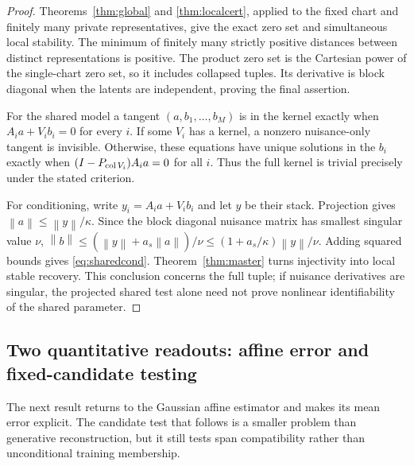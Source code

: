\documentclass[11pt,a4paper]{article}
\theoremstyle{definition}
\theoremstyle{definition}
\theoremstyle{remark}\newtheorem{remark}[theorem]{Remark}
\newcommand{\norm}[1]{\left\lVert #1\right\rVert}
\newcommand{\proj}[1]{P_{#1}}
\begin{document}
\begin{proof}
Theorems~\ref{thm:global} and \ref{thm:localcert}, applied to the fixed chart and finitely many private representatives, give the exact zero set and simultaneous local stability. The minimum of finitely many strictly positive distances between distinct representations is positive. The product zero set is the Cartesian power of the single-chart zero set, so it includes collapsed tuples. Its derivative is block diagonal when the latents are independent, proving the final assertion.

For the shared model a tangent $(a,b_1,\ldots,b_M)$ is in the kernel exactly when $A_ia+V_ib_i=0$ for every $i$. If some $V_i$ has a kernel, a nonzero nuisance-only tangent is invisible. Otherwise, these equations have unique solutions in the $b_i$ exactly when $(I-\proj{\col V_i})A_ia=0$ for all $i$. Thus the full kernel is trivial precisely under the stated criterion.

For conditioning, write $y_i=A_ia+V_ib_i$ and let $y$ be their stack. Projection gives $\norm a\le\norm y/\kappa$. Since the block diagonal nuisance matrix has smallest singular value $\nu$,
$\norm b\le(\norm y+a_s\norm a)/\nu\le(1+a_s/\kappa)\norm y/\nu$.
Adding squared bounds gives \eqref{eq:sharedcond}. Theorem~\ref{thm:master} turns injectivity into local stable recovery. This conclusion concerns the full tuple; if nuisance derivatives are singular, the projected shared test alone need not prove nonlinear identifiability of the shared parameter.
\end{proof}

\subsection{Two quantitative readouts: affine error and fixed-candidate testing}

The next result returns to the Gaussian affine estimator and makes its mean error explicit. The candidate test that follows is a smaller problem than generative reconstruction, but it still tests span compatibility rather than unconditional training membership.
\end{document}
